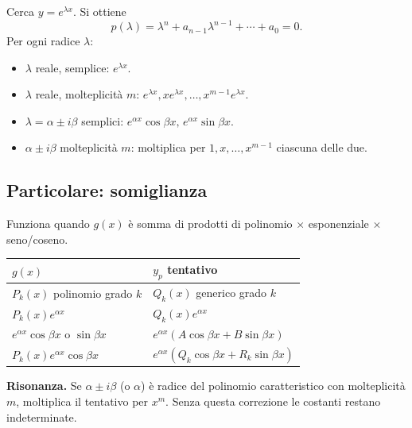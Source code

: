 \documentclass[11pt,a4paper,openany]{book}
\theoremstyle{plain}
\theoremstyle{definition}
\theoremstyle{remark}
\begin{document}
Cerca $y=e^{\lambda x}$. Si ottiene
\begin{equation}
  p(\lambda)=\lambda^n+a_{n-1}\lambda^{n-1}+\cdots+a_0=0.
  \label{eq:carat}
\end{equation}
Per ogni radice $\lambda$:
\begin{itemize}[leftmargin=*]
  \item $\lambda$ reale, semplice: $e^{\lambda x}$.
  \item $\lambda$ reale, molteplicit\`a $m$: $e^{\lambda x},xe^{\lambda x},\dots,x^{m-1}e^{\lambda x}$.
  \item $\lambda=\alpha\pm i\beta$ semplici: $e^{\alpha x}\cos\beta x,\,e^{\alpha x}\sin\beta x$.
  \item $\alpha\pm i\beta$ molteplicit\`a $m$: moltiplica per
        $1,x,\dots,x^{m-1}$ ciascuna delle due.
\end{itemize}

\subsection{Particolare: somiglianza}

Funziona quando $g(x)$ \`e somma di prodotti di polinomio $\times$
esponenziale $\times$ seno/coseno.

\begin{center}
\renewcommand{\arraystretch}{1.25}
\begin{tabular}{|l|l|}
\hline
\textbf{$g(x)$} & \textbf{$y_p$ tentativo}\\\hline
$P_k(x)$ polinomio grado $k$ & $Q_k(x)$ generico grado $k$\\\hline
$P_k(x)e^{\alpha x}$ & $Q_k(x)e^{\alpha x}$\\\hline
$e^{\alpha x}\cos\beta x$ o $\sin\beta x$ & $e^{\alpha x}(A\cos\beta x+B\sin\beta x)$\\\hline
$P_k(x)e^{\alpha x}\cos\beta x$ & $e^{\alpha x}(Q_k\cos\beta x+R_k\sin\beta x)$\\\hline
\end{tabular}
\end{center}

\begin{trappola}
\textbf{Risonanza.} Se $\alpha\pm i\beta$ (o $\alpha$) \`e radice del polinomio
caratteristico con molteplicit\`a $m$, moltiplica il tentativo per $x^m$.
Senza questa correzione le costanti restano indeterminate.
\end{trappola}
\end{document}
